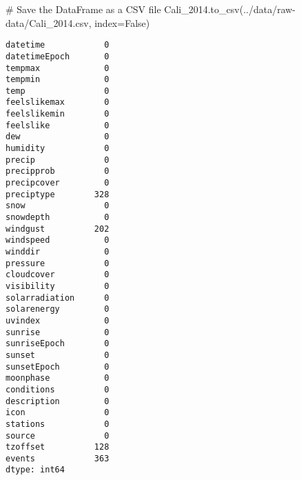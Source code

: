 \documentclass[
  letterpaper,
  DIV=11,
  numbers=noendperiod]{scrartcl}
\newenvironment{Shaded}{\begin{snugshade}}{\end{snugshade}}
\newcommand{\CommentTok}[1]{\textcolor[rgb]{0.37,0.37,0.37}{#1}}
\newcommand{\NormalTok}[1]{\textcolor[rgb]{0.00,0.23,0.31}{#1}}
\newcommand{\OperatorTok}[1]{\textcolor[rgb]{0.37,0.37,0.37}{#1}}
\newcommand{\StringTok}[1]{\textcolor[rgb]{0.13,0.47,0.30}{#1}}
\newcommand{\VariableTok}[1]{\textcolor[rgb]{0.07,0.07,0.07}{#1}}
\begin{document}
\begin{Shaded}
\begin{Highlighting}[]
\CommentTok{\# Save the DataFrame as a CSV file}
\NormalTok{Cali\_2014.to\_csv(}\StringTok{\textquotesingle{}../data/raw{-}data/Cali\_2014.csv\textquotesingle{}}\NormalTok{, index}\OperatorTok{=}\VariableTok{False}\NormalTok{)}
\end{Highlighting}
\end{Shaded}

\begin{Shaded}
\begin{Highlighting}[]

\end{Highlighting}
\end{Shaded}

\begin{verbatim}
datetime            0
datetimeEpoch       0
tempmax             0
tempmin             0
temp                0
feelslikemax        0
feelslikemin        0
feelslike           0
dew                 0
humidity            0
precip              0
precipprob          0
precipcover         0
preciptype        328
snow                0
snowdepth           0
windgust          202
windspeed           0
winddir             0
pressure            0
cloudcover          0
visibility          0
solarradiation      0
solarenergy         0
uvindex             0
sunrise             0
sunriseEpoch        0
sunset              0
sunsetEpoch         0
moonphase           0
conditions          0
description         0
icon                0
stations            0
source              0
tzoffset          128
events            363
dtype: int64
\end{verbatim}
\end{document}
